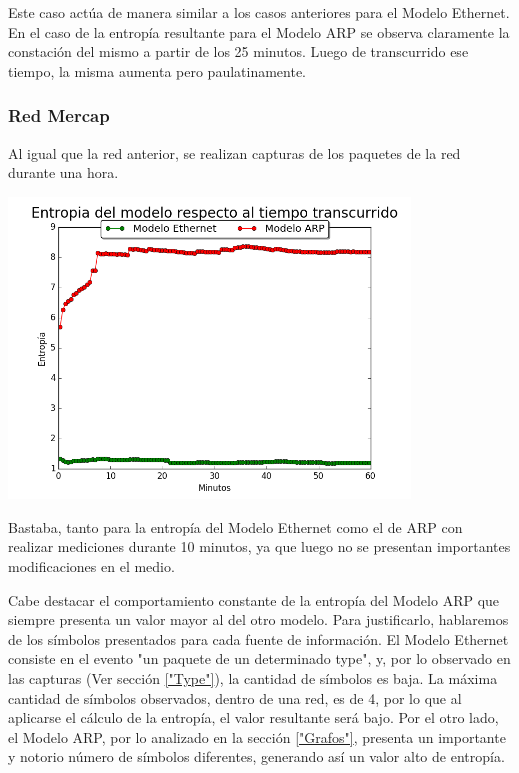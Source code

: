 Este caso actúa de manera similar a los casos anteriores para el Modelo Ethernet. En el caso de la entropía resultante para el Modelo ARP se observa claramente la constación del mismo a partir de los 25 minutos. Luego de transcurrido ese tiempo, la misma aumenta pero paulatinamente. 


\subsubsection{Red Mercap}
Al igual que la red anterior, se realizan capturas de los paquetes de la red durante una hora. 

\centerline{\includegraphics[width=0.8\textwidth]{./graficos/entrophyVSTime/laburo_eze.png}}

Bastaba, tanto para la entropía del Modelo Ethernet como el de ARP con realizar mediciones durante 10 minutos, ya que luego no se presentan importantes modificaciones en el medio. 

Cabe destacar el comportamiento constante de la entropía del Modelo ARP que siempre presenta un valor mayor al del otro modelo. Para justificarlo, hablaremos de los símbolos presentados para cada fuente de información. El Modelo Ethernet consiste en el evento "un paquete de un determinado type", y, por lo observado en las capturas (Ver sección \ref{"Type"}), la cantidad de símbolos es baja. La máxima cantidad de símbolos observados, dentro de una red, es de 4, por lo que al aplicarse el cálculo de la entropía, el valor resultante será bajo. Por el otro lado, el Modelo ARP, por lo analizado en la sección \ref{"Grafos"}, presenta un importante y notorio número de símbolos diferentes, generando así un valor alto de entropía. 